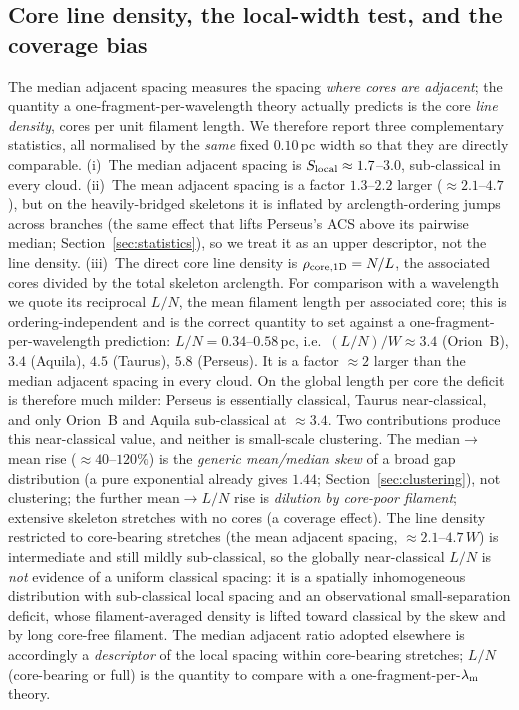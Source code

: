 \documentclass[usenatbib,twoside,twocolumn]{mnras}
\begin{document}
\subsection{Core line density, the local-width test, and the coverage bias}
\label{sec:linedensity}
The median adjacent spacing measures the spacing \emph{where cores are adjacent}; the quantity a one-fragment-per-wavelength theory actually predicts is the core \emph{line density}, cores per unit filament length. We therefore report three complementary statistics, all normalised by the \emph{same} fixed $0.10$\,pc width so that they are directly comparable. (i)~The median adjacent spacing is $S_{\rm local}\approx1.7$--$3.0$, sub-classical in every cloud. (ii)~The mean adjacent spacing is a factor $1.3$--$2.2$ larger ($\approx2.1$--$4.7$), but on the heavily-bridged skeletons it is inflated by arclength-ordering jumps across branches (the same effect that lifts Perseus's ACS above its pairwise median; Section~\ref{sec:statistics}), so we treat it as an upper descriptor, not the line density. (iii)~The direct core line density is $\rho_{\rm core,1D}=N/L$, the associated cores divided by the total skeleton arclength. For comparison with a wavelength we quote its reciprocal $L/N$, the mean filament length per associated core; this is ordering-independent and is the correct quantity to set against a one-fragment-per-wavelength prediction: $L/N=0.34$--$0.58$\,pc, i.e.\ $(L/N)/W\approx3.4$ (Orion~B), $3.4$ (Aquila), $4.5$ (Taurus), $5.8$ (Perseus). It is a factor $\approx2$ larger than the median adjacent spacing in every cloud. On the global length per core the deficit is therefore much milder: Perseus is essentially classical, Taurus near-classical, and only Orion~B and Aquila sub-classical at $\approx3.4$. Two contributions produce this near-classical value, and neither is small-scale clustering. The median$\to$mean rise ($\approx40$--$120\%$) is the \emph{generic mean/median skew} of a broad gap distribution (a pure exponential already gives $1.44$; Section~\ref{sec:clustering}), not clustering; the further mean$\to L/N$ rise is \emph{dilution by core-poor filament}; extensive skeleton stretches with no cores (a coverage effect). The line density restricted to core-bearing stretches (the mean adjacent spacing, $\approx2.1$--$4.7\,W$) is intermediate and still mildly sub-classical, so the globally near-classical $L/N$ is \emph{not} evidence of a uniform classical spacing: it is a spatially inhomogeneous distribution with sub-classical local spacing and an observational small-separation deficit, whose filament-averaged density is lifted toward classical by the skew and by long core-free filament. The median adjacent ratio adopted elsewhere is accordingly a \emph{descriptor} of the local spacing within core-bearing stretches; $L/N$ (core-bearing or full) is the quantity to compare with a one-fragment-per-$\lambda_{\rm m}$ theory.
\end{document}
